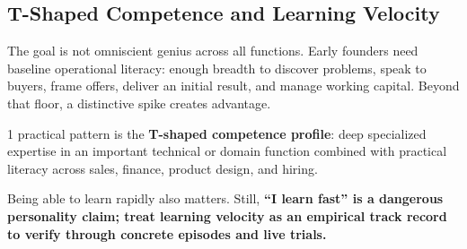 \subsection{T-Shaped Competence and Learning Velocity}

The goal is not omniscient genius across all functions. Early founders need baseline operational literacy: enough breadth to discover problems, speak to buyers, frame offers, deliver an initial result, and manage working capital. Beyond that floor, a distinctive spike creates advantage.

1 practical pattern is the \textbf{T-shaped competence profile}: deep specialized expertise in an important technical or domain function combined with practical literacy across sales, finance, product design, and hiring.

Being able to learn rapidly also matters. Still, \textbf{``I learn fast'' is a dangerous personality claim; treat learning velocity as an empirical track record to verify through concrete episodes and live trials.}
